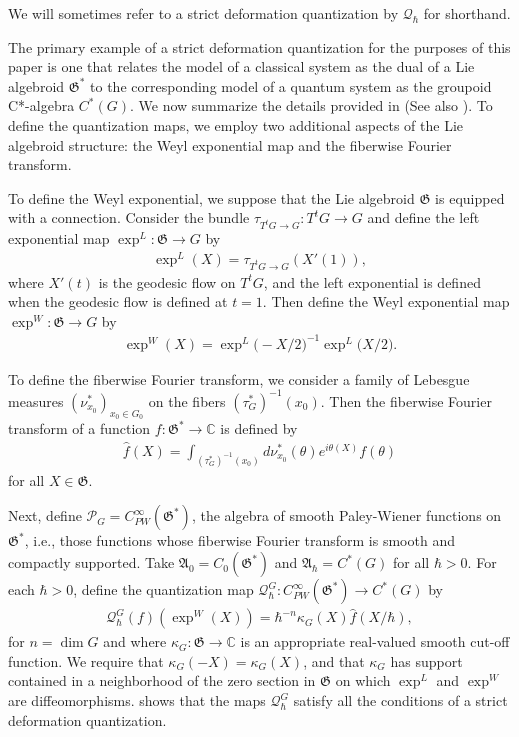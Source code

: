 \documentclass[sn-mathphys,Numbered]{sn-jnl}
\begin{document}
\noindent We will sometimes refer to a strict deformation quantization by $\mathcal{Q}_\hbar$ for shorthand.

The primary example of a strict deformation quantization for the purposes of this paper is one that relates the model of a classical system as the dual of a Lie algebroid $\mathfrak{G}^*$ to the corresponding model of a quantum system as the groupoid C*-algebra $C^*(G)$. 
 We now summarize the details provided in \citet{La98b,La99} (See also \citet{LaRa00}).  To define the quantization maps, we employ two additional aspects of the Lie algebroid structure: the Weyl exponential map and the fiberwise Fourier transform.

To define the Weyl exponential, we suppose that the Lie algebroid $\mathfrak{G}$ is equipped with a connection.  Consider the bundle $\tau_{T^tG\to G}: T^tG\to G$ and define the left exponential map $\exp^L: \mathfrak{G}\to G$ by
\begin{align}
    \exp^L(X) = \tau_{T^tG\to G}(X'(1)),
\end{align}
where $X'(t)$ is the geodesic flow on $T^tG$, and the left exponential is defined when the geodesic flow is defined at $t=1$.  Then define the Weyl exponential map $\exp^W: \mathfrak{G}\to G$ by
\begin{align}
    \exp^W(X) = \exp^L\big(-X/2\big)^{-1}\exp^L\big(X/2\big).
\end{align}

To define the fiberwise Fourier transform, we consider a family of Lebesgue measures $(\nu^*_{x_0})_{x_0\in G_0}$ on the fibers $(\tau_G^*)^{-1}(x_0)$.  Then the fiberwise Fourier transform of a function $f: \mathfrak{G}^*\to \mathbb{C}$ is defined by
\begin{align}
    \hat{f}(X) = \int_{(\tau_G^*)^{-1}(x_0)} d\nu^*_{x_0}(\theta)e^{i\theta(X)} f(\theta)
\end{align}
for all $X\in \mathfrak{G}$.

Next, define $\mathcal{P}_G = C^\infty_{PW}(\mathfrak{G}^*)$, the algebra of smooth Paley-Wiener functions on $\mathfrak{G}^*$, i.e., those functions whose fiberwise Fourier transform is smooth and compactly supported.   Take $\mathfrak{A}_0 = C_0(\mathfrak{G}^*)$ and $\mathfrak{A}_\hbar = C^*(G)$ for all $\hbar >0$.  For each $\hbar>0$, define the quantization map $\mathcal{Q}^G_\hbar: C_{PW}^\infty(\mathfrak{G}^*)\to C^*(G)$ by
\begin{align}
\label{eq:quantization_map}
    \mathcal{Q}^G_\hbar(f)(\exp^W (X)) = \hbar^{-n}\kappa_G(X)\hat{f}(X/\hbar),
\end{align}
for $n = \dim G$ and where $\kappa_G: \mathfrak{G}\to \mathbb{C}$ is an appropriate real-valued smooth cut-off function.  We require that $\kappa_G(-X) = \kappa_G(X)$, and that $\kappa_G$ has support contained in a neighborhood of the zero section in $\mathfrak{G}$ on which $\exp^L$ and $\exp^W$ are diffeomorphisms.  \citet{La99} shows that the maps $\mathcal{Q}_\hbar^G$ satisfy all the conditions of a strict deformation quantization.
\end{document}
